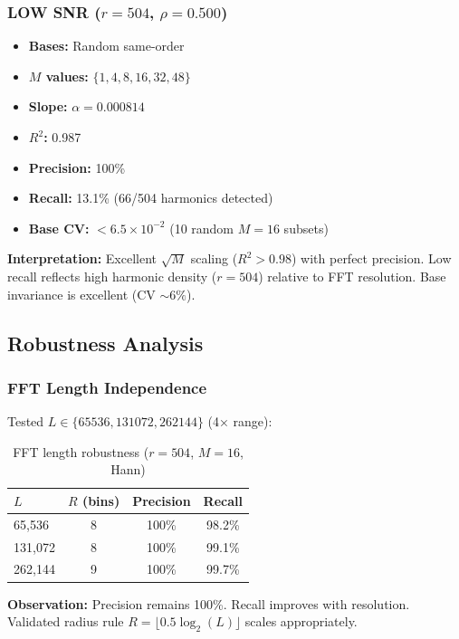 \subsubsection{LOW SNR ($r=504$, $\rho=0.500$)}

\begin{itemize}
    \item \textbf{Bases:} Random same-order
    \item \textbf{$M$ values:} $\{1,4,8,16,32,48\}$
    \item \textbf{Slope:} $\alpha = 0.000814$
    \item \textbf{$R^2$:} 0.987
    \item \textbf{Precision:} 100\%
    \item \textbf{Recall:} 13.1\% (66/504 harmonics detected)
    \item \textbf{Base CV:} $< 6.5 \times 10^{-2}$ (10 random $M=16$ subsets)
\end{itemize}

\textbf{Interpretation:} Excellent $\sqrt{M}$ scaling ($R^2 > 0.98$) with perfect precision. Low recall reflects high harmonic density ($r=504$) relative to FFT resolution. Base invariance is excellent (CV $\sim 6\%$).

\subsection{Robustness Analysis}

\subsubsection{FFT Length Independence}

Tested $L \in \{65536, 131072, 262144\}$ (4× range):

\begin{table}[h]
\centering
\begin{tabular}{@{}lccc@{}}
\toprule
$L$ & $R$ (bins) & Precision & Recall \\
\midrule
65,536 & 8 & 100\% & 98.2\% \\
131,072 & 8 & 100\% & 99.1\% \\
262,144 & 9 & 100\% & 99.7\% \\
\bottomrule
\end{tabular}
\caption{FFT length robustness ($r=504$, $M=16$, Hann)}
\end{table}

\textbf{Observation:} Precision remains 100\%. Recall improves with resolution. Validated radius rule $R = \lfloor 0.5 \log_2(L) \rfloor$ scales appropriately.

